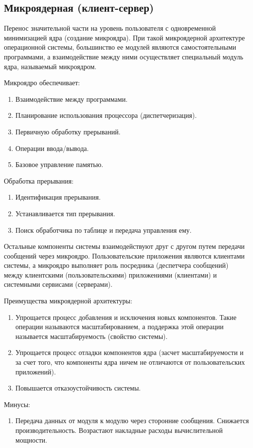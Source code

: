 \subsection{Микроядерная (клиент-сервер)}
Перенос значительной части на уровень пользователя с одновременной минимизацией
ядра (создание микроядра). При такой микроядерной архитектуре операционной
системы, большинство ее модулей являются самостоятельными программами, а
взаимодействие между ними осуществляет специальный модуль ядра, называемый
микроядром.\par
Микроядро обеспечивает:
\begin{enumerate}
  \item Взаимодействие между программами.
  \item Планирование использования процессора (диспетчеризация).
  \item Первичную обработку прерываний.
  \item Операции ввода/вывода.
  \item Базовое управление памятью.
\end{enumerate}
Обработка прерывания:
\begin{enumerate}
  \item Идентификация прерывания.
  \item Устанавливается тип прерывания.
  \item Поиск обработчика по таблице и передача управления ему.
\end{enumerate}\par

Остальные компоненты системы взаимодействуют друг с другом путем передачи
сообщений через микроядро. Пользовательские приложения являются клиентами
системы, а микроядро выполняет роль посредника (деспетчера сообщений) между
клиентскими (пользовательскими) приложениями (клиентами) и системными сервисами
(серверами).\par

Преимущества микроядерной архитектуры:
\begin{enumerate}
  \item Упрощается процесс добавления и исключения новых компонентов. Такие
    операции называются масштабированием, а поддержка этой операции называется
    масштабируемость (свойство системы).
  \item Упрощается процесс отладки компонентов ядра (засчет масштабируемости и
    за счет того, что компоненты ядра ничем не отличаются от пользовательских
    приложений). 
  \item Повышается отказоустойчивость системы.
\end{enumerate}
Минусы:
\begin{enumerate}
  \item Передача данных от модуля к модулю через сторонние сообщения. Снижается
    производительность. Возрастают накладные расходы вычислительной мощности.
\end{enumerate}

